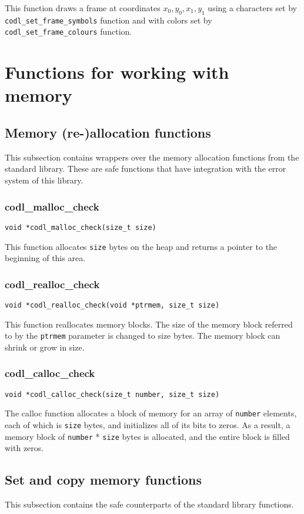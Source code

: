 \documentclass{article}
\newcommand{\fstep}{\vspace{3mm}\noindent}
\begin{document}
\fstep{} This function draws a frame at coordinates $x_0, y_0, x_1, y_1$ using a
characters set by {\tt codl\_set\_frame\_symbols} function and with colors set by
{\tt codl\_set\_frame\_colours} function.

\section{Functions for working with memory}
\subsection{Memory (re-)allocation functions}
This subsection contains wrappers over the memory allocation functions from
the standard library. These are safe functions that have integration with the
error system of this library.

\subsubsection{codl\_malloc\_check}
{\tt void *codl\_malloc\_check(size\_t size)}

\fstep{} This function allocates {\tt size} bytes on the heap and returns a pointer
to the beginning of this area.

\subsubsection{codl\_realloc\_check}
{\tt void *codl\_realloc\_check(void *ptrmem, size\_t size)}
              
\fstep{} This function reallocates memory blocks. The size of the memory
block referred to by the {\tt ptrmem} parameter is changed to size bytes.
The memory block can shrink or grow in size.

\subsubsection{codl\_calloc\_check}
{\tt void *codl\_calloc\_check(size\_t number, size\_t size)}

\fstep{} The calloc function allocates a block of memory for an array of {\tt number}
elements, each of which is {\tt size} bytes, and initializes all of its bits to
zeros. As a result, a memory block of {\tt number} * {\tt size} bytes is allocated, and
the entire block is filled with zeros.

\subsection{Set and copy memory functions}
This subsection contains the safe counterparts of the standard library functions.
\end{document}

